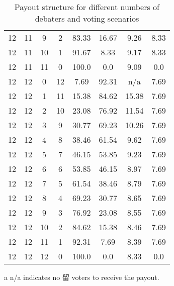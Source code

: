 \begin{table}[h]
\begin{threeparttable}
\begin{tabular}{cccccccc}
12 & 11 & 9 & 2 & 83.33 & 16.67 & 9.26 & 8.33 \\
12 & 11 & 10 & 1 & 91.67 & 8.33 & 9.17 & 8.33 \\
12 & 11 & 11 & 0 & 100.0 & 0.0 & 9.09 & 0.0 \\
12 & 12 & 0 & 12 & 7.69 & 92.31 & n/a\tnote{a} & 7.69 \\
12 & 12 & 1 & 11 & 15.38 & 84.62 & 15.38 & 7.69 \\
12 & 12 & 2 & 10 & 23.08 & 76.92 & 11.54 & 7.69 \\
12 & 12 & 3 & 9 & 30.77 & 69.23 & 10.26 & 7.69 \\
12 & 12 & 4 & 8 & 38.46 & 61.54 & 9.62 & 7.69 \\
12 & 12 & 5 & 7 & 46.15 & 53.85 & 9.23 & 7.69 \\
12 & 12 & 6 & 6 & 53.85 & 46.15 & 8.97 & 7.69 \\
12 & 12 & 7 & 5 & 61.54 & 38.46 & 8.79 & 7.69 \\
12 & 12 & 8 & 4 & 69.23 & 30.77 & 8.65 & 7.69 \\
12 & 12 & 9 & 3 & 76.92 & 23.08 & 8.55 & 7.69 \\
12 & 12 & 10 & 2 & 84.62 & 15.38 & 8.46 & 7.69 \\
12 & 12 & 11 & 1 & 92.31 & 7.69 & 8.39 & 7.69 \\
12 & 12 & 12 & 0 & 100.0 & 0.0 & 8.33 & 0.0 \\

\bottomrule
\end{tabular}
\begin{tablenotes}
    \item[a] n/a indicates no 留 voters to receive the payout.
\end{tablenotes}
\caption{Payout structure for different numbers of debaters and voting scenarios}
\end{threeparttable}
\end{table}

